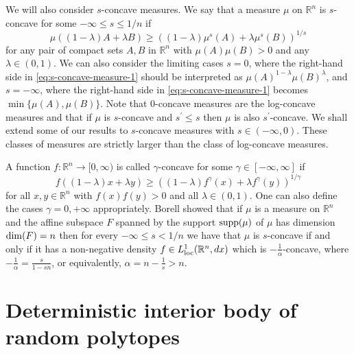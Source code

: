 \documentclass[11pt,leqno]{article}
\theoremstyle{definition}
\theoremstyle{remark}
\numberwithin{equation}{section}
\newcommand{\ls}{\leqslant}
\newcommand{\gr}{\geqslant}
\newcommand{\1}{\textbf{1}}
\begin{document}
We will also consider $s$-concave measures. We say that a measure $\mu $ on
${\mathbb R}^n$ is $s$-concave for some $-\infty\ls s\ls 1/n$ if
\begin{equation}\label{eq:s-concave-measure-1}\mu ((1-\lambda )A+\lambda B)\gr
((1-\lambda )\mu^{s}(A)+\lambda \mu^{s}(B))^{1/s}\end{equation}
for any pair of compact sets $A,B$ in ${\mathbb R}^n$ with $\mu (A)\mu (B)>0$ and any $\lambda\in (0,1)$.
We can also consider the limiting cases $s =0$, where the right-hand side in \eqref{eq:s-concave-measure-1}
should be interpreted as $\mu(A)^{1-\lambda }\mu (B)^{\lambda }$, and $s=-\infty $, where the right-hand side in \eqref{eq:s-concave-measure-1} becomes $\min\{\mu (A),\mu (B)\}$. Note that $0$-concave measures are the log-concave
measures and that if $\mu $ is $s$-concave and $s^{\prime}\ls s$ then $\mu $ is also $s^{\prime}$-concave.
We shall extend some of our results to $s$-concave measures with $s\in (-\infty,0)$. These classes of
measures are strictly larger than the class of log-concave measures.

A function $f:\mathbb R^n\to [0,\infty)$ is called $\gamma $-concave for some $\gamma\in [-\infty ,\infty ]$ if
\begin{equation*}f((1-\lambda )x+\lambda y)\gr ((1-\lambda )f^{\gamma }(x)+\lambda f^{\gamma }(y))^{1/\gamma }\end{equation*}
for all $x,y\in {\mathbb R}^n$ with $f(x)f(y)>0$ and all $\lambda\in (0,1)$. One can also
define the cases $\gamma =0,+\infty $ appropriately. Borell \cite{Borell-1975}
showed that if $\mu $ is a measure on ${\mathbb R}^n$ and the affine subspace $F$ spanned by the support
${\rm supp}(\mu )$ of $\mu $ has dimension ${\rm dim}(F)=n$ then for every $-\infty \ls s <1/n$ we have that
$\mu $ is $s$-concave if and only if it has a non-negative density $f\in L_{{\rm loc}}^1({\mathbb R}^n,dx)$
which is $-\frac{1}{\alpha}$-concave, where $-\frac{1}{\alpha}=\frac{s}{1-sn}$, or equivalently,
$\alpha =n-\frac{1}{s}>n$.


\section{Deterministic interior body of random polytopes}\label{section-3}
\end{document}
